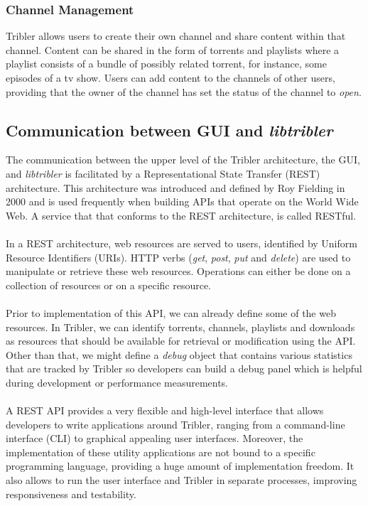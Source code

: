 \subsubsection{\textbf{Channel Management}}
Tribler allows users to create their own channel and share content within that channel. Content can be shared in the form of torrents and playlists where a playlist consists of a bundle of possibly related torrent, for instance, some episodes of a tv show. Users can add content to the channels of other users, providing that the owner of the channel has set the status of the channel to \emph{open}.

\subsection{Communication between GUI and \emph{libtribler}}
The communication between the upper level of the Tribler architecture, the GUI, and \emph{libtribler} is facilitated by a Representational State Transfer (REST) architecture. This architecture was introduced and defined by Roy Fielding in 2000\cite{fielding2000fielding} and is used frequently when building APIs that operate on the World Wide Web. A service that that conforms to the REST architecture, is called RESTful.\\\\
In a REST architecture, web resources are served to users, identified by Uniform Resource Identifiers (URIs). HTTP verbs (\emph{get}, \emph{post}, \emph{put} and \emph{delete}) are used to manipulate or retrieve these web resources. Operations can either be done on a collection of resources or on a specific resource.\\\\
Prior to implementation of this API, we can already define some of the web resources. In Tribler, we can identify torrents, channels, playlists and downloads as resources that should be available for retrieval or modification using the API. Other than that, we might define a \emph{debug} object that contains various statistics that are tracked by Tribler so developers can build a debug panel which is helpful during development or performance measurements.\\\\
A REST API provides a very flexible and high-level interface that allows developers to write applications around Tribler, ranging from a command-line interface (CLI) to graphical appealing user interfaces. Moreover, the implementation of these utility applications are not bound to a specific programming language, providing a huge amount of implementation freedom. It also allows to run the user interface and Tribler in separate processes, improving responsiveness and testability.

